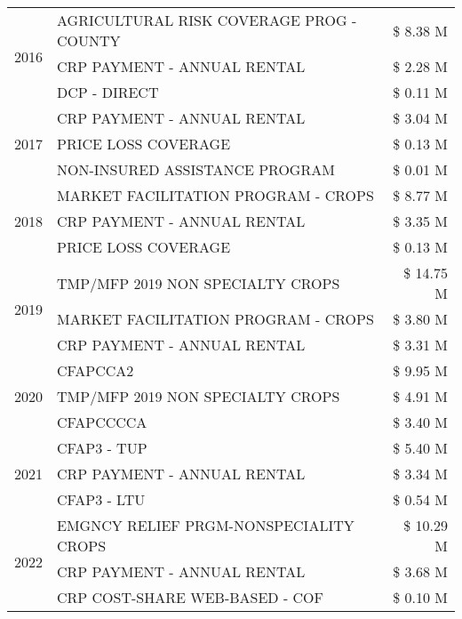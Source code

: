 \begin{tabular}{llr}
\cline{1-3}
\multirow[t]{3}{*}{2016} & AGRICULTURAL RISK COVERAGE PROG - COUNTY & \$ 8.38 M \\
 & CRP PAYMENT - ANNUAL RENTAL & \$ 2.28 M \\
 & DCP - DIRECT & \$ 0.11 M \\
\cline{1-3}
\multirow[t]{3}{*}{2017} & CRP PAYMENT - ANNUAL RENTAL & \$ 3.04 M \\
 & PRICE LOSS COVERAGE & \$ 0.13 M \\
 & NON-INSURED ASSISTANCE PROGRAM & \$ 0.01 M \\
\cline{1-3}
\multirow[t]{3}{*}{2018} & MARKET FACILITATION PROGRAM - CROPS & \$ 8.77 M \\
 & CRP PAYMENT - ANNUAL RENTAL & \$ 3.35 M \\
 & PRICE LOSS COVERAGE & \$ 0.13 M \\
\cline{1-3}
\multirow[t]{3}{*}{2019} & TMP/MFP 2019 NON SPECIALTY CROPS & \$ 14.75 M \\
 & MARKET FACILITATION PROGRAM - CROPS & \$ 3.80 M \\
 & CRP PAYMENT - ANNUAL RENTAL & \$ 3.31 M \\
\cline{1-3}
\multirow[t]{3}{*}{2020} & CFAPCCA2 & \$ 9.95 M \\
 & TMP/MFP 2019 NON SPECIALTY CROPS & \$ 4.91 M \\
 & CFAPCCCCA & \$ 3.40 M \\
\cline{1-3}
\multirow[t]{3}{*}{2021} & CFAP3 - TUP & \$ 5.40 M \\
 & CRP PAYMENT - ANNUAL RENTAL & \$ 3.34 M \\
 & CFAP3 - LTU & \$ 0.54 M \\
\cline{1-3}
\multirow[t]{3}{*}{2022} & EMGNCY RELIEF PRGM-NONSPECIALITY CROPS & \$ 10.29 M \\
 & CRP PAYMENT - ANNUAL RENTAL & \$ 3.68 M \\
 & CRP COST-SHARE WEB-BASED - COF & \$ 0.10 M \\
\cline{1-3}
\bottomrule
\end{tabular}
